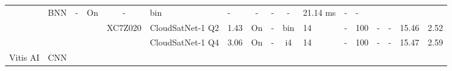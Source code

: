 \documentclass{article}
\begin{document}
\begin{table}
\begin{adjustbox}{totalheight=\baselineskip,}
\begin{tabular}{ccccclp{2em}cp{3em}cp{2em}p{4em}p{3em}p{3.5em}p{3.5em}p{2.5em}p{3em}}
                   &\multirow{1}{*}{BNN}
                       &\multirow{1}{*}{-}
                           &\multirow{1}{*}{On}
                               &\multirow{1}{*}{-}
                                   &\multirow{1}{*}{bin}
                                       &\multirow{1}{*}{-}
                                           &\multirow{1}{*}{-}
                                               &\multirow{1}{*}{-}
                                                   &\multirow{1}{*}{-}
                                                       &\multirow{1}{*}{21.14 ms}
                                                           &\multirow{1}{*}{-}
                                                               &\multirow{1}{*}{-}\\
\cmidrule{4-17}
   &   &   &\multirow{2}{*}{\cite{pitonakCloudSatNet1FPGABasedHardwareAccelerated2022}}
               &\multirow{2}{*}{XC7Z020}
                   &\multirow{1}{*}{CloudSatNet-1 Q2}
                       &\multirow{1}{*}{1.43}
                           &\multirow{1}{*}{On}
                               &\multirow{1}{*}{-}
                                   &\multirow{1}{*}{bin}
                                       &\multirow{1}{*}{14}
                                           &\multirow{1}{*}{-}
                                               &\multirow{1}{*}{100}
                                                   &\multirow{1}{*}{-}
                                                       &\multirow{1}{*}{-}
                                                           &\multirow{1}{*}{15.46}
                                                               &\multirow{1}{*}{2.52}\\
   &   &   &   &   &\multirow{1}{*}{CloudSatNet-1 Q4}
                       &\multirow{1}{*}{3.06}
                           &\multirow{1}{*}{On}
                               &\multirow{1}{*}{-}
                                   &\multirow{1}{*}{i4}
                                       &\multirow{1}{*}{14}
                                           &\multirow{1}{*}{-}
                                               &\multirow{1}{*}{100}
                                                   &\multirow{1}{*}{-}
                                                       &\multirow{1}{*}{-}
                                                           &\multirow{1}{*}{15.47}
                                                               &\multirow{1}{*}{2.59}\\
\cmidrule{1-17}
\multirow{12}{*}{Vitis AI}
   &\multirow{12}{*}{CNN}

\end{tabular}
\end{adjustbox}
\end{table}
\end{document}
